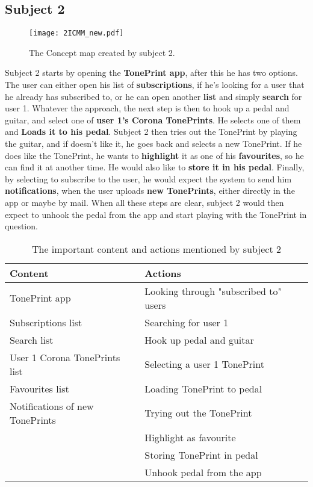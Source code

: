 \subsection*{Subject 2}
\label{Subject2}
%
\begin{figure}[H]
	\centering
	\texttt{[image: 2ICMM\_new.pdf]}
	\caption{The Concept map created by subject 2.}
	\label{fig:ICMM2}
\end{figure}
%
Subject 2 starts by opening the \textbf{TonePrint app}, after this he has two options. The user can either open his list of \textbf{subscriptions}, if he's looking for a user that he already has subscribed to, or he can open another \textbf{list} and simply \textbf{search} for user 1. Whatever the approach, the next step is then to hook up a pedal and guitar, and select one of \textbf{user 1's Corona TonePrints}. He selects one of them and \textbf{Loads it to his pedal}. Subject 2 then tries out the TonePrint by playing the guitar, and if doesn't like it, he goes back and selects a new TonePrint. If he does like the TonePrint, he wants to \textbf{highlight} it as one of his \textbf{favourites}, so he can find it at another time. He would also like to \textbf{store it in his pedal}. Finally, by selecting to subscribe to the user, he would expect the system to send him \textbf{notifications}, when the user uploads \textbf{new TonePrints}, either directly in the app or maybe by mail. When all these steps are clear, subject 2 would then expect to unhook the pedal from the app and start playing with the TonePrint in question. \\
%
\begin{table}[H]
\begin{minipage}[b]{\linewidth}\centering
	\begin{tabular} {|l|l|l|} \hline
		\rowcolor{xGray25} \textbf{Content} & \textbf{Actions} \\  \hline
		TonePrint app & Looking through "subscribed to" users \\
		Subscriptions list & Searching for user 1 \\
		Search list & Hook up pedal and guitar \\
		User 1 Corona TonePrints list & Selecting a user 1 TonePrint \\
		Favourites list & Loading TonePrint to pedal \\
		Notifications of new TonePrints & Trying out the TonePrint \\
		 & Highlight as favourite \\
		 & Storing TonePrint in pedal \\
		 & Unhook pedal from the app \\ \hline
	\end{tabular}
	\caption{The important content and actions mentioned by subject 2}
	\label{tab:Subject2ContentActions}
\end{minipage}
\end{table}


